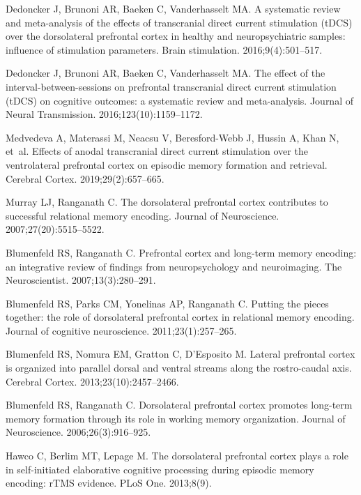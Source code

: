\documentclass[10pt,letterpaper]{article}
\begin{document}
\begin{thebibliography}{10}
Dedoncker J, Brunoni AR, Baeken C, Vanderhasselt MA.
\newblock A systematic review and meta-analysis of the effects of transcranial
  direct current stimulation (tDCS) over the dorsolateral prefrontal cortex in
  healthy and neuropsychiatric samples: influence of stimulation parameters.
\newblock Brain stimulation. 2016;9(4):501--517.

Dedoncker J, Brunoni AR, Baeken C, Vanderhasselt MA.
\newblock The effect of the interval-between-sessions on prefrontal
  transcranial direct current stimulation (tDCS) on cognitive outcomes: a
  systematic review and meta-analysis.
\newblock Journal of Neural Transmission. 2016;123(10):1159--1172.

Medvedeva A, Materassi M, Neacsu V, Beresford-Webb J, Hussin A, Khan N, et~al.
\newblock Effects of anodal transcranial direct current stimulation over the
  ventrolateral prefrontal cortex on episodic memory formation and retrieval.
\newblock Cerebral Cortex. 2019;29(2):657--665.

Murray LJ, Ranganath C.
\newblock The dorsolateral prefrontal cortex contributes to successful
  relational memory encoding.
\newblock Journal of Neuroscience. 2007;27(20):5515--5522.

Blumenfeld RS, Ranganath C.
\newblock Prefrontal cortex and long-term memory encoding: an integrative
  review of findings from neuropsychology and neuroimaging.
\newblock The Neuroscientist. 2007;13(3):280--291.

Blumenfeld RS, Parks CM, Yonelinas AP, Ranganath C.
\newblock Putting the pieces together: the role of dorsolateral prefrontal
  cortex in relational memory encoding.
\newblock Journal of cognitive neuroscience. 2011;23(1):257--265.

Blumenfeld RS, Nomura EM, Gratton C, D'Esposito M.
\newblock Lateral prefrontal cortex is organized into parallel dorsal and
  ventral streams along the rostro-caudal axis.
\newblock Cerebral Cortex. 2013;23(10):2457--2466.

Blumenfeld RS, Ranganath C.
\newblock Dorsolateral prefrontal cortex promotes long-term memory formation
  through its role in working memory organization.
\newblock Journal of Neuroscience. 2006;26(3):916--925.

Hawco C, Berlim MT, Lepage M.
\newblock The dorsolateral prefrontal cortex plays a role in self-initiated
  elaborative cognitive processing during episodic memory encoding: rTMS
  evidence.
\newblock PLoS One. 2013;8(9).


\end{thebibliography}
\end{document}
